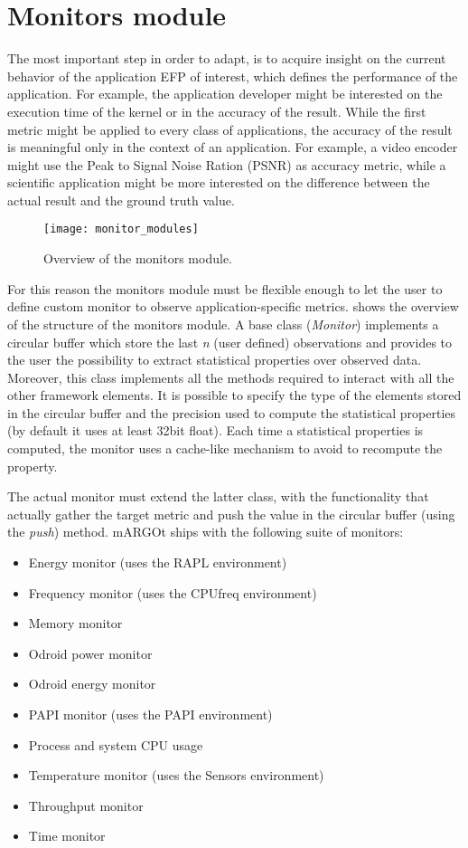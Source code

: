 \section{Monitors module}


The most important step in order to adapt, is to acquire insight on the current behavior of the application EFP of interest, which defines the performance of the application.
For example, the application developer might be interested on the execution time of the kernel or in the accuracy of the result.
While the first metric might be applied to every class of applications, the accuracy of the result is meaningful only in the context of an application.
For example, a video encoder might use the Peak to Signal Noise Ration (PSNR) as accuracy metric, while a scientific application might be more interested on the difference between the actual result and the ground truth value.

\begin{figure}
	\centering
	\texttt{[image: monitor\_modules]}
	\caption{Overview of the monitors module. }
	\label{fig:monitor_module}
\end{figure}

For this reason the monitors module must be flexible enough to let the user to define custom monitor to observe application-specific metrics.
 shows the overview of the structure of the monitors module.
A base class (\textit{Monitor}) implements a circular buffer which store the last \textit{n} (user defined) observations and provides to the user the possibility to extract statistical properties over observed data.
Moreover, this class implements all the methods required to interact with all the other framework elements.
It is possible to specify the type of the elements stored in the circular buffer and the precision used to compute the statistical properties (by default it uses at least 32bit float).
Each time a statistical properties is computed, the monitor uses a cache-like mechanism to avoid to recompute the property.


The actual monitor must extend the latter class, with the functionality that actually gather the target metric and push the value in the circular buffer (using the \textit{push}) method.
mARGOt ships with the following suite of monitors:

\begin{itemize}
	\item Energy monitor (uses the RAPL environment)
	\item Frequency monitor (uses the CPUfreq environment)
	\item Memory monitor
	\item Odroid power monitor
	\item Odroid energy monitor
	\item PAPI monitor (uses the PAPI environment)
	\item Process and system CPU usage
	\item Temperature monitor (uses the Sensors environment)
	\item Throughput monitor
	\item Time monitor
\end{itemize}


